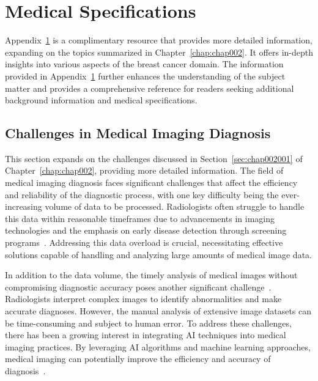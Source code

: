 \chapter{Medical Specifications}
\label{chap:app001}

Appendix~\ref{chap:app001} is a complimentary resource that provides more detailed information, expanding on the topics summarized in Chapter~\ref{chap:chap002}.
It offers in-depth insights into various aspects of the breast cancer domain.
The information provided in Appendix~\ref{chap:app001} further enhances the understanding of the subject matter and provides a comprehensive reference for readers seeking additional background information and medical specifications.

\section{Challenges in Medical Imaging Diagnosis}
\label{sec:app001001}

This section expands on the challenges discussed in Section~\ref{sec:chap002001} of Chapter~\ref{chap:chap002}, providing more detailed information.
The field of medical imaging diagnosis faces significant challenges that affect the efficiency and reliability of the diagnostic process, with one key difficulty being the ever-increasing volume of data to be processed.
Radiologists often struggle to handle this data within reasonable timeframes due to advancements in imaging technologies and the emphasis on early disease detection through screening programs~\cite{HANNA20181709, McKinney2020}.
Addressing this data overload is crucial, necessitating effective solutions capable of handling and analyzing large amounts of medical image data.

In addition to the data volume, the timely analysis of medical images without compromising diagnostic accuracy poses another significant challenge~\cite{10.1145/3399715.3399744, 10.1145/3132272.3134111}.
Radiologists interpret complex images to identify abnormalities and make accurate diagnoses.
However, the manual analysis of extensive image datasets can be time-consuming and subject to human error.
To address these challenges, there has been a growing interest in integrating \ac{AI} techniques into medical imaging practices.
By leveraging AI algorithms and machine learning approaches, medical imaging can potentially improve the efficiency and accuracy of diagnosis~\cite{Lambin2017, pesapane2018artificial, doi:10.1148/radiol.2015151169}.

